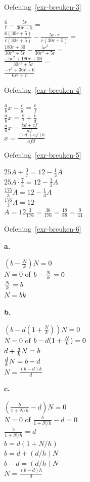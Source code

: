 \documentclass[
  a4paper,
]{scrbook}
\theoremstyle{definition}
\theoremstyle{remark}
\begin{document}
Oefening~\ref{exr-breuken-3}

\(\frac{6}{r} - \frac{5r}{30r+5} =\)\\
\(\frac{6(30r + 5)}{r(30r + 5)} - \frac{5r\cdot r}{r(30r+5)} =\)\\
\(\frac{180r + 30}{30r^2 + 5r} - \frac{5r^2}{30r^2+5r} =\)\\
\(\frac{-5r^2 + 180r + 30}{30r^2 + 5r} =\)\\
\(\frac{-r^2 + 36r + 6}{6r^2 + r}\)

Oefening~\ref{exr-breuken-4}

\(\frac{a}{b}x - \frac{c}{d} = \frac{e}{f}\)\\
\(\frac{a}{b}x=\frac{e}{f}+\frac{c}{d}\)\\
\(\frac{a}{b}x=\frac{ed+cf}{df}\)\\
\(x=\frac{(ed+cf)b}{afd}\)

Oefening~\ref{exr-breuken-5}

\(25A\div\frac{3}{7} = 12 - \frac{1}{3}A\)\\
\(25 A \cdot\frac{7}{3}=12-\frac{1}{3}A\)\\
\(\frac{175}{3}A=12-\frac{1}{3}A\)\\
\(\frac{176}{3}A=12\)\\
\(A=12\frac{3}{176}=\frac{36}{176}=\frac{18}{88}=\frac{9}{44}\)

Oefening~\ref{exr-breuken-6}

\textbf{a.}

\((b-\frac{N}{k})N = 0\)\\
\(N=0\) of \(b-{N \over k}=0\)\\
\({N \over k}=b\)\\
\(N=bk\)

\textbf{b.}

\((b-d(1+\frac{N}{k}))N = 0\)\\
\(N=0\) of \(b-d(1+{N \over k})=0\)\\
\(d+{d\over k}N=b\)\\
\({d\over k}N=b-d\)\\
\(N=\frac{(b-d)k}{d}\)

\textbf{c.}

\((\frac{b}{1+N/h}-d)N = 0\)\\
\(N=0\) of \(\frac{b}{1+N/h}-d=0\)\\
\(\frac{b}{1+N/h}=d\)\\
\(b=d(1+N/h)\)\\
\(b=d+(d/h)N\)\\
\(b-d=(d/h)N\)\\
\(N=\frac{(b-d)h}{d}\)
\end{document}
